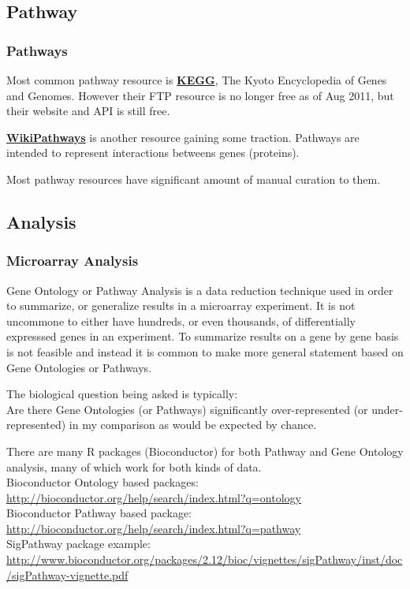\documentclass[pdf]{beamer}
\begin{document}
\subsection{Pathway}
\begin{frame}[allowframebreaks]
  \frametitle{Pathways}
Most common pathway resource is \textbf{\href{http://www.genome.jp/kegg/pathway.html}{KEGG}}, The Kyoto Encyclopedia of Genes and Genomes. However their FTP resource is no longer free as of Aug 2011, but their website and API is still free. 
\vspace{0.1in}

\textbf{\href{http://www.wikipathways.org/index.php/WikiPathways}{WikiPathways}} is another resource gaining some traction. Pathways are intended to represent interactions betweens genes (proteins).
\vspace{0.1in}

Most pathway resources have  significant amount of manual curation to them.

\end{frame}

\subsection{Analysis}
\begin{frame}[allowframebreaks]
  \frametitle{Microarray Analysis}
  Gene Ontology or Pathway Analysis is a data reduction technique used in order to summarize, or generalize results in a microarray experiment. It is not uncommone to either have hundreds, or even thousands, of differentially expresssed genes in an experiment. To summarize results on a gene by gene basis is not feasible and instead it is common to make more general statement based on Gene Ontologies or Pathways.
  \vspace{0.1in}
  
  The biological question being asked is typically:\\
  Are there Gene Ontologies (or Pathways) significantly over-represented (or under-represented) in my comparison as would be expected by chance. 

There are many R packages (Bioconductor) for both Pathway and Gene Ontology analysis, many of which work for both kinds of data.\\

Bioconductor Ontology based packages: \url{http://bioconductor.org/help/search/index.html?q=ontology}\\
Bioconductor Pathway based package: \url{http://bioconductor.org/help/search/index.html?q=pathway}\\

SigPathway package example:\\
\url{http://www.bioconductor.org/packages/2.12/bioc/vignettes/sigPathway/inst/doc/sigPathway-vignette.pdf}

\end{frame}
\end{document}
